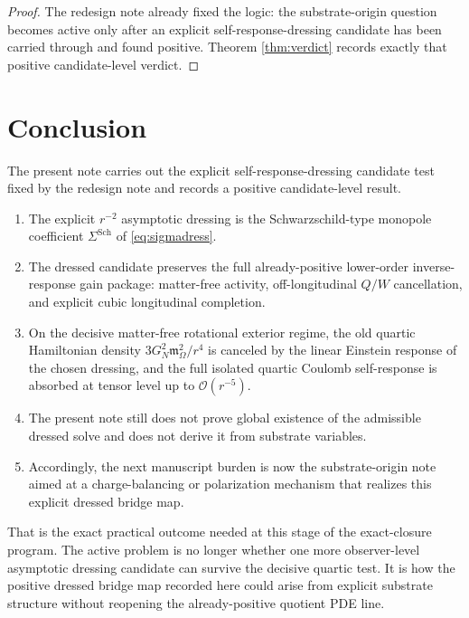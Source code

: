 \documentclass[11pt]{article}
\newcommand{\SigmaDressSch}{\Sigma^{\mathrm{Sch}}}
\newcommand{\HamChargeOmega}{\mathfrak m_{\Omega}}
\begin{document}
\begin{proof}
The redesign note already fixed the logic: the substrate-origin question becomes active only after an explicit self-response-dressing candidate has been carried through and found positive. Theorem \ref{thm:verdict} records exactly that positive candidate-level verdict.
\end{proof}

\section{Conclusion}

The present note carries out the explicit self-response-dressing candidate test fixed by the redesign note and records a positive candidate-level result.

\begin{enumerate}
    \item The explicit \(r^{-2}\) asymptotic dressing is the Schwarzschild-type monopole coefficient \(\SigmaDressSch\) of \eqref{eq:sigmadress}.
    \item The dressed candidate preserves the full already-positive lower-order inverse-response gain package: matter-free activity, off-longitudinal \(Q/W\) cancellation, and explicit cubic longitudinal completion.
    \item On the decisive matter-free rotational exterior regime, the old quartic Hamiltonian density \(3G_N^2\HamChargeOmega^2/r^4\) is canceled by the linear Einstein response of the chosen dressing, and the full isolated quartic Coulomb self-response is absorbed at tensor level up to \(\mathcal O(r^{-5})\).
    \item The present note still does not prove global existence of the admissible dressed solve and does not derive it from substrate variables.
    \item Accordingly, the next manuscript burden is now the substrate-origin note aimed at a charge-balancing or polarization mechanism that realizes this explicit dressed bridge map.
\end{enumerate}

That is the exact practical outcome needed at this stage of the exact-closure program. The active problem is no longer whether one more observer-level asymptotic dressing candidate can survive the decisive quartic test. It is how the positive dressed bridge map recorded here could arise from explicit substrate structure without reopening the already-positive quotient PDE line.
\end{document}

